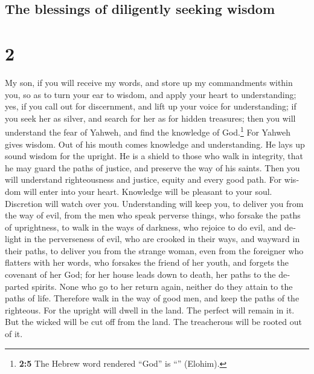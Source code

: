 \begin{paracol}{2}
\switchcolumn
\begin{otherlanguage}{english}

\hypertarget{the-blessings-of-diligently-seeking-wisdom}{%
\subsection{The blessings of diligently seeking
wisdom}\label{the-blessings-of-diligently-seeking-wisdom}}

\hypertarget{section-3}{%
\section{2}\label{section-3}}

 My son, if you will receive my words, and store up my
commandments within you,  so as to turn your ear to
wisdom, and apply your heart to understanding;  yes, if
you call out for discernment, and lift up your voice for understanding;
 if you seek her as silver, and search for her as for
hidden treasures;  then you will understand the fear of
Yahweh, and find the knowledge of God.\footnote{\textbf{2:5} The Hebrew
  word rendered ``God'' is ``'' (Elohim).} 
For Yahweh gives wisdom. Out of his mouth comes knowledge and
understanding.  He lays up sound wisdom for the upright.
He is a shield to those who walk in integrity,  that he
may guard the paths of justice, and preserve the way of his saints.
 Then you will understand righteousness and justice,
equity and every good path.  For wisdom will enter into
your heart. Knowledge will be pleasant to your soul. 
Discretion will watch over you. Understanding will keep you,
 to deliver you from the way of evil, from the men who
speak perverse things,  who forsake the paths of
uprightness, to walk in the ways of darkness,  who
rejoice to do evil, and delight in the perverseness of evil,
 who are crooked in their ways, and wayward in their
paths,  to deliver you from the strange woman, even from
the foreigner who flatters with her words,  who forsakes
the friend of her youth, and forgets the covenant of her God;
 for her house leads down to death, her paths to the
departed spirits.  None who go to her return again,
neither do they attain to the paths of life.  Therefore
walk in the way of good men, and keep the paths of the righteous.
 For the upright will dwell in the land. The perfect will
remain in it.  But the wicked will be cut off from the
land. The treacherous will be rooted out of it.


\end{otherlanguage}
\end{paracol}
